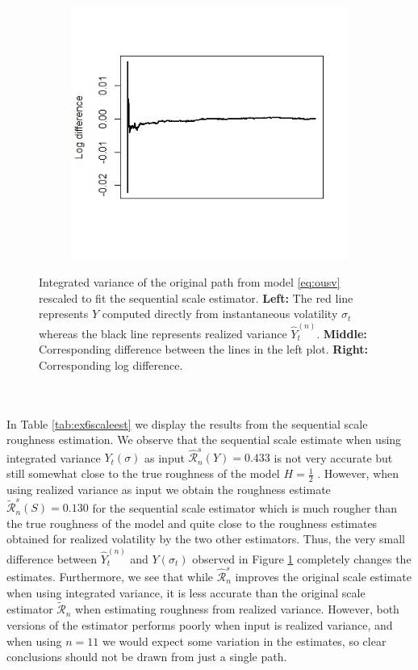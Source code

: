 \documentclass{article}
\begin{document}
\begin{figure}[h]
\begin{subfigure}{0.32\textwidth}
    \end{subfigure}\hfill
    \begin{subfigure}{0.32\textwidth}
        \centering
        \includegraphics[width=\textwidth]{ex6_scale3.jpeg}
    \end{subfigure}
    \caption{Integrated variance of the original path from model \eqref{eq:ousv} rescaled to fit the sequential scale estimator. \textbf{Left:} The red line represents $Y$ computed directly from instantaneous volatility $\sigma_t$ whereas the black line represents realized variance $\hat{Y}_t^{(n)}$. \textbf{Middle:} Corresponding difference between the lines in the left plot. \textbf{Right:} Corresponding log difference.}
    \label{fig:ex6scale}
\end{figure}\\\\
In Table \ref{tab:ex6scaleest} we display the results from the sequential scale roughness estimation. We observe that the sequential scale estimate when using integrated variance $Y_t(\sigma)$ as input $\widehat{\mathscr{R}}_n^s(Y)=0.433$ is not very accurate but still somewhat close to the true roughness of the model $H=\frac{1}{2}$ . However, when using realized variance as input we obtain the roughness estimate $\widetilde{\mathscr{R}}_n^s (S) = 0.130$ for the sequential scale estimator which is much rougher than the true roughness of the model and quite close to the roughness estimates obtained for realized volatility by the two other estimators. Thus, the very small difference between $\hat{Y}_t^{(n)}$ and $Y(\sigma_t)$ observed in Figure \ref{fig:ex6scale} completely changes the estimates. Furthermore, we see that while $\widehat{\mathscr{R}}_n^s$ improves the original scale estimate when using integrated variance, it is less accurate than the original scale estimator $\widetilde{\mathscr{R}}_n$ when estimating roughness from realized variance. However, both versions of the estimator performs poorly when input is realized variance, and when using $n=11$ we would expect some variation in the estimates, so clear conclusions should not be drawn from just a single path.
\end{document}
